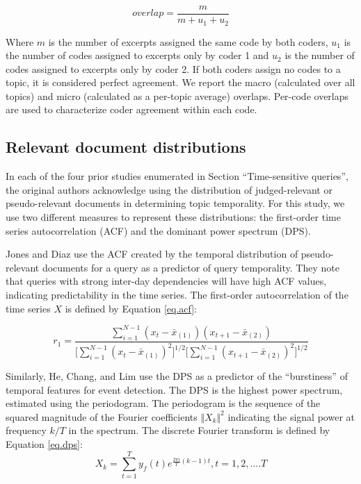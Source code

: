 \documentclass{asist}
\begin{document}
\[
overlap = \frac{m}{m + u_1 + u_2} 
\]

Where $m$ is the number of excerpts assigned the same code by both coders, $u_1$ is the number of codes assigned to excerpts only by coder 1 and $u_2$ is the number of codes assigned to excerpts only by coder 2. If both coders assign no codes to a topic, it is considered perfect agreement. We report the macro (calculated over all topics) and micro (calculated as a per-topic average) overlaps.  Per-code overlaps are used to characterize coder agreement within each code.

\subsection{Relevant document distributions}

In each of the four prior studies enumerated in Section ``Time-sensitive queries'', the original authors acknowledge using the distribution of judged-relevant or pseudo-relevant documents in determining topic temporality. For this study, we use two different measures to represent these distributions: the first-order time series autocorrelation (ACF) and the dominant power spectrum (DPS).

Jones and Diaz \cite{Jones2007} use the ACF created by the temporal distribution of pseudo-relevant documents for a query as a predictor of query temporality. They note that queries with strong inter-day dependencies will have high ACF values, indicating predictability in the time series. The first-order autocorrelation of the time series $X$ is defined by Equation \ref{eq.acf}:

\begin{equation}
r_1 = \dfrac{\sum_{i=1}^{N-1} (x_t - \bar{x}_{(1)})(x_{t+1} - \bar{x}_{(2)})}{ \big [ \sum_{i=1}^{N-1}  (x_t - \bar{x}_{(1)})^2 \big ] ^{1/2} \big [\sum_{i=1}^{N-1} (x_{t+1} - \bar{x}_{(2)})^2 \big ]^{1/2}}
\label{eq.acf}
\end{equation}

Similarly, He, Chang, and Lim \cite{He2007} use the DPS as a predictor of the ``burstiness'' of temporal features for event detection. The DPS is the highest power spectrum, estimated using the periodogram. The periodogram is the sequence of the squared magnitude of the Fourier coefficients $\Vert X_k \Vert^2$ indicating the signal power at frequency $k/T$ in the spectrum.  The discrete Fourier transform is defined by Equation \ref{eq.dps}:
\begin{equation}
X_k = \sum_{t=1}^T y_f(t)e^{\frac{2\pi i}{T}(k - 1)t}, t=1,2,....T
\label{eq.dps}
\end{equation}
\end{document}

